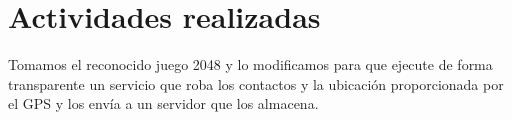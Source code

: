 \section{Actividades realizadas}

Tomamos el reconocido juego 2048 y lo modificamos para que ejecute de forma transparente un servicio que roba los contactos y la ubicaci\'on proporcionada por el GPS y los env\'ia a un servidor que los almacena. 


